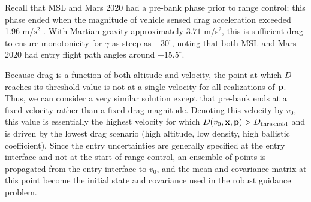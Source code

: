 Recall that MSL and Mars 2020 had a pre-bank phase prior to range control; this phase ended when the magnitude of vehicle sensed drag acceleration exceeded 1.96 m$/\mathrm{s}^2$ \cite{MSL_EDL2}.
With Martian gravity approximately $3.71$ m/s$^2$, this is sufficient drag to ensure monotonicity for $\gamma$ as steep as $-30^{\circ}$, noting that both MSL and Mars 2020 had entry flight path angles around $-15.5^{\circ}$. 

Because drag is a function of both altitude and velocity, the point at which $D$ reaches its threshold value is not at a single velocity for all realizations of $\mathbf{p}$. Thus, we can consider a very similar solution except that pre-bank ends at a fixed velocity rather than a fixed drag magnitude. Denoting this velocity by $v_0$, this value is essentially the highest velocity for which $D(v_0,\mathbf{x},\mathbf{p})>D_{\mathrm{threshold}}$ and is driven by the lowest drag scenario (high altitude, low density, high ballistic coefficient). 
Since the entry uncertainties are generally specified at the entry interface and not at the start of range control, an ensemble of points is propagated from the entry interface to $v_0$, and the mean and covariance matrix at this point become the initial state and covariance used in the robust guidance problem. 



